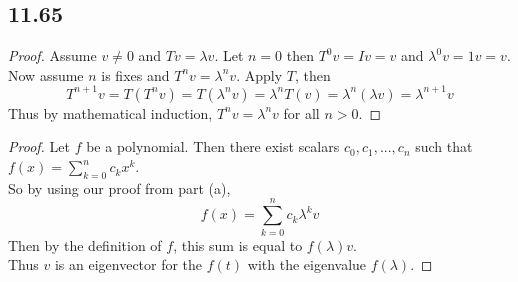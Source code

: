 \documentclass{report}
\theoremstyle{plain}
\theoremstyle{definition}
\theoremstyle{plain}
\begin{document}
\subsection{11.65}
\begin{proof}
Assume $v\neq 0$ and $Tv=\lambda v$.
Let $n=0$ then $T^0v=Iv=v$ and $\lambda^0v=1v=v$. Now assume $n$ is fixes and $T^nv=\lambda^nv$. Apply $T$, then 
\[T^{n+1}v=T(T^nv)=T(\lambda^nv)=\lambda^nT(v) = \lambda^n(\lambda v)=\lambda^{n+1}v \]
Thus by mathematical induction, $T^nv=\lambda^nv$ for all $n > 0$.
\end{proof}
\begin{proof}
Let $f$ be a polynomial. Then there exist scalars $c_0,c_1,...,c_n$ such that $f(x)=\sum_{k=0}^nc_kx^k$.\\
So by using our proof from part (a),
\[ f(x)=\sum_{k=0}^nc_k\lambda^kv \]
Then by the definition of $f$, this sum is equal to $f(\lambda)v$.\\
Thus $v$ is an eigenvector for the $f(t)$ with the eigenvalue $f(\lambda)$.
\end{proof}
\end{document}
